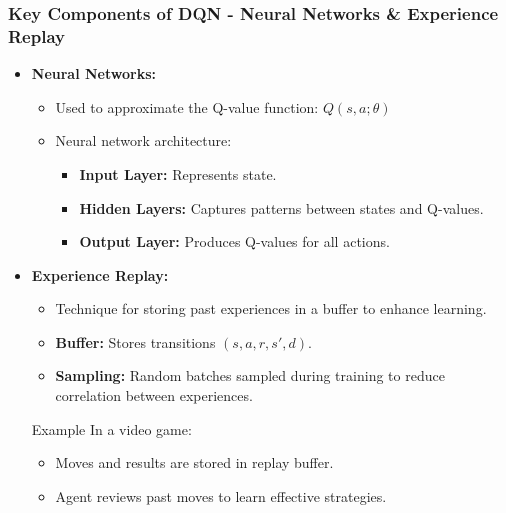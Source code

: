 \documentclass{beamer}
\begin{document}
\begin{frame}[fragile]
    \frametitle{Key Components of DQN - Neural Networks & Experience Replay}
    \begin{itemize}
        \item \textbf{Neural Networks:}
        \begin{itemize}
            \item Used to approximate the Q-value function: \( Q(s, a; \theta) \)
            \item Neural network architecture:
            \begin{itemize}
                \item \textbf{Input Layer:} Represents state.
                \item \textbf{Hidden Layers:} Captures patterns between states and Q-values.
                \item \textbf{Output Layer:} Produces Q-values for all actions.
            \end{itemize}
        \end{itemize}
        
        \item \textbf{Experience Replay:}
        \begin{itemize}
            \item Technique for storing past experiences in a buffer to enhance learning.
            \item \textbf{Buffer:} Stores transitions \( (s, a, r, s', d) \).
            \item \textbf{Sampling:} Random batches sampled during training to reduce correlation between experiences.
        \end{itemize}
        \begin{block}{Example}
            In a video game:
            \begin{itemize}
                \item Moves and results are stored in replay buffer.
                \item Agent reviews past moves to learn effective strategies.
            \end{itemize}
        \end{block}
    \end{itemize}
\end{frame}
\end{document}
